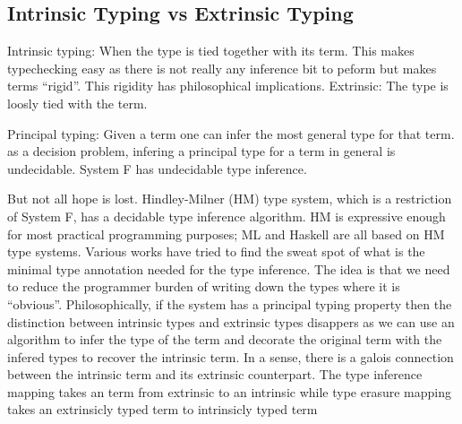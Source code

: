 \documentclass[manuscript,screen,nonacm]{acmart}
\begin{document}
\subsection{Intrinsic Typing vs Extrinsic Typing} %
Intrinsic typing: When the type is tied together with its term. This makes typechecking easy as there is not really any inference bit to peform but makes terms ``rigid''. This rigidity has philosophical implications.
Extrinsic: The type is loosly tied with the term.

Principal typing: Given a term one can infer the most general type for that term.
as a decision problem, infering a principal type for a term in general is undecidable.
System F has undecidable type inference\cite{wells_typability_1999}.

But not all hope is lost. Hindley-Milner (HM) type system, which is a restriction of System F, has a decidable type inference algorithm. HM is expressive enough for most practical programming purposes; ML and Haskell are all based on HM type systems.
Various works have tried to find the sweat spot of what is the minimal type annotation needed for the type inference.
The idea is that we need to reduce the programmer burden of writing down the types where it is ``obvious''.
Philosophically, if the system has a principal typing property then the distinction between intrinsic types and extrinsic types disappers as we can use an algorithm to infer the type of the term and decorate the original term with the infered types to recover the intrinsic term. In a sense, there is a galois connection between the intrinsic term and its extrinsic counterpart. The type inference mapping takes an term from extrinsic to an intrinsic while type erasure mapping takes an extrinsicly typed term to intrinsicly typed term


\end{document}
